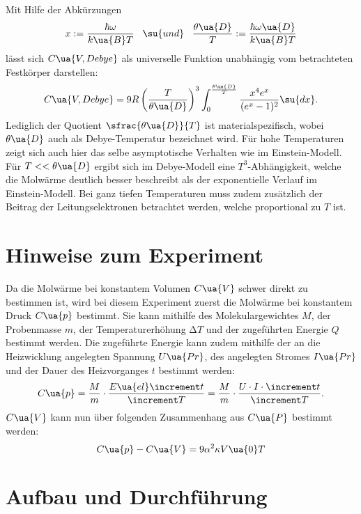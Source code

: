 Mit Hilfe der Abkürzungen
\begin{equation}
  x:=\frac{\hbar\omega}{k\ua{B}T} \,\,\,\,\, \su{und} \,\,\,\,\, \frac{\theta\ua{D}}{T} := \frac{\hbar\omega\ua{D}}{k\ua{B}T}
\end{equation}
lässt sich $C\ua{V,Debye}$ als universelle Funktion unabhängig vom betrachteten
Festkörper darstellen:
\begin{equation}
  C\ua{V,Debye} = 9R \left(\frac{T}{\theta\ua{D}}\right)^3\int_0^{\frac{\theta\ua{D}}{T}} \frac{x^4e^x}{(e^x-1)^2}\su{dx}.
\end{equation}
Lediglich der Quotient $\sfrac{\theta\ua{D}}{T}$ ist
materialspezifisch, wobei $\theta\ua{D}$ auch als Debye-Temperatur bezeichnet wird.
Für hohe Temperaturen zeigt sich auch hier das selbe asymptotische Verhalten wie
im Einstein-Modell. Für $T<<\theta\ua{D}$ ergibt sich im Debye-Modell eine $T^3$-Abhängigkeit,
welche die Molwärme deutlich besser beschreibt als der exponentielle Verlauf im
Einstein-Modell.
Bei ganz tiefen Temperaturen muss zudem zusätzlich der Beitrag der Leitungselektronen
betrachtet werden, welche proportional zu $T$ ist.

\section{Hinweise zum Experiment}

Da die Molwärme bei konstantem Volumen $C\ua{V}$ schwer direkt zu bestimmen ist,
wird bei diesem Experiment zuerst die Molwärme bei konstantem Druck $C\ua{p}$
bestimmt. Sie kann mithilfe des Molekulargewichtes $M$, der Probenmasse $m$,
der Temperaturerhöhung $\increment T$ und der zugeführten Energie $Q$ bestimmt werden.
Die zugeführte Energie kann zudem mithilfe der an die Heizwicklung angelegten Spannung
$U\ua{Pr}$, des angelegten Stromes $I\ua{Pr}$ und der Dauer des Heizvorganges $t$ bestimmt werden:
\begin{equation}
  \label{eqn:c_p}
  C\ua{p} = \frac{M}{m}\cdot\frac{E\ua{el}\increment t}{\increment T} = \frac{M}{m}\cdot\frac{U\cdot I\cdot \increment t}{\increment T}.
\end{equation}
$C\ua{V}$ kann nun über folgenden Zusammenhang aus $C\ua{P}$ bestimmt werden:
\begin{equation}
  \label{eqn:c_p-c_v}
  C\ua{p}-C\ua{V} = 9\alpha^2\kappa V\ua{0}T
\end{equation}

\newpage

\section{Aufbau und Durchführung}

